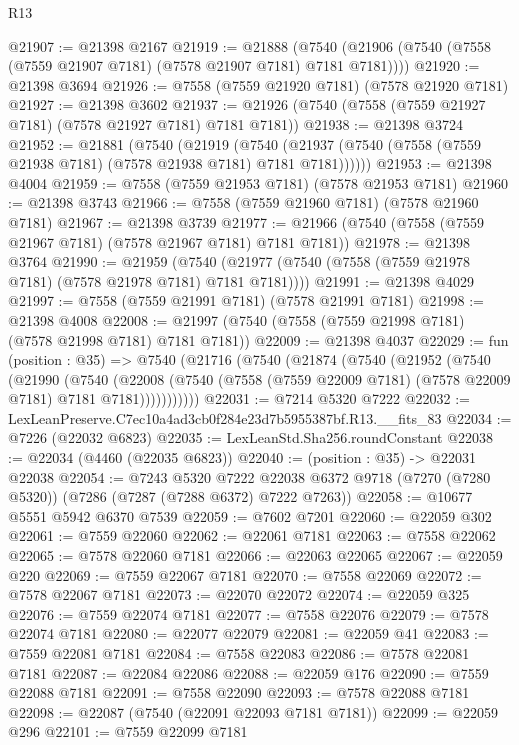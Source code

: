 \begin{lexlean}{R13}
\begin{coremodule}
@21907 := @21398 @2167
@21919 := @21888
    (@7540 (@21906 (@7540 (@7558 (@7559 @21907 @7181) (@7578 @21907 @7181) @7181 @7181))))
@21920 := @21398 @3694
@21926 := @7558 (@7559 @21920 @7181) (@7578 @21920 @7181)
@21927 := @21398 @3602
@21937 := @21926 (@7540 (@7558 (@7559 @21927 @7181) (@7578 @21927 @7181) @7181 @7181))
@21938 := @21398 @3724
@21952 := @21881
    (@7540
      (@21919
        (@7540 (@21937 (@7540 (@7558 (@7559 @21938 @7181) (@7578 @21938 @7181) @7181 @7181))))))
@21953 := @21398 @4004
@21959 := @7558 (@7559 @21953 @7181) (@7578 @21953 @7181)
@21960 := @21398 @3743
@21966 := @7558 (@7559 @21960 @7181) (@7578 @21960 @7181)
@21967 := @21398 @3739
@21977 := @21966 (@7540 (@7558 (@7559 @21967 @7181) (@7578 @21967 @7181) @7181 @7181))
@21978 := @21398 @3764
@21990 := @21959
    (@7540 (@21977 (@7540 (@7558 (@7559 @21978 @7181) (@7578 @21978 @7181) @7181 @7181))))
@21991 := @21398 @4029
@21997 := @7558 (@7559 @21991 @7181) (@7578 @21991 @7181)
@21998 := @21398 @4008
@22008 := @21997 (@7540 (@7558 (@7559 @21998 @7181) (@7578 @21998 @7181) @7181 @7181))
@22009 := @21398 @4037
@22029 := fun (position : @35) =>
  @7540
    (@21716
      (@7540
        (@21874
          (@7540
            (@21952
              (@7540
                (@21990
                  (@7540
                    (@22008
                      (@7540 (@7558 (@7559 @22009 @7181) (@7578 @22009 @7181) @7181 @7181)))))))))))
@22031 := @7214 @5320 @7222
@22032 := LexLeanPreserve.C7ec10a4ad3cb0f284e23d7b5955387bf.R13.__fits_83
@22034 := @7226 (@22032 @6823)
@22035 := LexLeanStd.Sha256.roundConstant
@22038 := @22034 (@4460 (@22035 @6823))
@22040 := (position : @35) -> @22031 @22038
@22054 := @7243
    @5320
    @7222
    @22038
    @6372
    @9718
    (@7270 (@7280 @5320))
    (@7286 (@7287 (@7288 @6372) @7222 @7263))
@22058 := @10677 @5551 @5942 @6370 @7539
@22059 := @7602 @7201
@22060 := @22059 @302
@22061 := @7559 @22060
@22062 := @22061 @7181
@22063 := @7558 @22062
@22065 := @7578 @22060 @7181
@22066 := @22063 @22065
@22067 := @22059 @220
@22069 := @7559 @22067 @7181
@22070 := @7558 @22069
@22072 := @7578 @22067 @7181
@22073 := @22070 @22072
@22074 := @22059 @325
@22076 := @7559 @22074 @7181
@22077 := @7558 @22076
@22079 := @7578 @22074 @7181
@22080 := @22077 @22079
@22081 := @22059 @41
@22083 := @7559 @22081 @7181
@22084 := @7558 @22083
@22086 := @7578 @22081 @7181
@22087 := @22084 @22086
@22088 := @22059 @176
@22090 := @7559 @22088 @7181
@22091 := @7558 @22090
@22093 := @7578 @22088 @7181
@22098 := @22087 (@7540 (@22091 @22093 @7181 @7181))
@22099 := @22059 @296
@22101 := @7559 @22099 @7181

\end{coremodule}
\end{lexlean}

